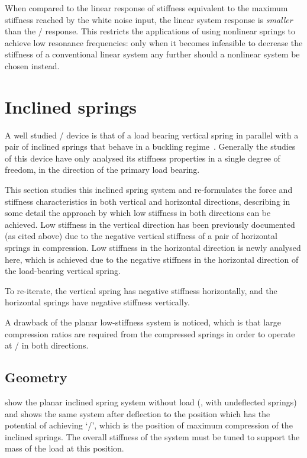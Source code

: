 When compared to the linear response of stiffness equivalent to the maximum
stiffness reached by the white noise input, the linear system response is
\emph{smaller} than the \qzs/ response. This restricts the applications of
using nonlinear springs to achieve low resonance frequencies: only when it
becomes infeasible to decrease the stiffness of a conventional linear system
any further should a nonlinear system be chosen instead.




\section{Inclined springs}

A well studied \qzs/ device is that of a load bearing vertical spring in
parallel with a pair of inclined springs that behave in a buckling
regime~\cite{molyneux1957,alabuzhev1989,carrella2006,carrella2007-jsv,carrella2008-thesis,carrella2009}.
Generally the studies of this device have only analysed its stiffness
properties in a single degree of freedom, in the direction of the primary load
bearing.

This section studies this inclined spring system and re-formulates the force
and stiffness characteristics in both vertical and horizontal directions,
describing in some detail the approach by which low stiffness in both
directions can be achieved. Low stiffness in the vertical direction has been
previously documented (as cited above) due to the negative vertical stiffness
of a pair of horizontal springs in compression. Low stiffness in the
horizontal direction is newly analysed here, which is achieved due to the
negative stiffness in the horizontal direction of the load-bearing vertical
spring.

To re-iterate, the vertical spring has negative stiffness horizontally, and
the horizontal springs have negative stiffness vertically.

A drawback of the planar low-stiffness system is noticed, which is that
large compression ratios are required from the compressed springs in order to
operate at \qzs/ in both directions.

\subsection{Geometry}

 show the planar inclined spring system without load (\ie,
with undeflected springs) and  shows the same system after
deflection to the position which has the potential of achieving `\qzs/', which
is the position of maximum compression of the inclined springs. The overall
stiffness of the system must be tuned to support the mass of the load at this
position.

